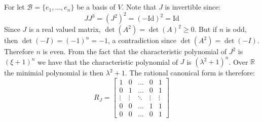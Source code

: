 \documentclass[crop=false,class=article]{standalone}                           %
\begin{document}
    \section{}
    \section{}
        For let $\mathscr{B}=\{e_{1},\dots,e_{n}\}$ be a basis of $V$. Note that
        $J$ is invertible since:
        \begin{equation}
            JJ^{3}=(J^{2})^{2}=(\minus\textrm{Id})^{2}=\textrm{Id}
        \end{equation}
        Since $J$ is a real valued matrix, $\det(A^{2})=\det(A)^{2}\geq{0}$.
        But if $n$ is odd, then $\det(\minus{I})=(\minus{1})^{n}=\minus{1}$,
        a contradiction since $\det(A^{2})=\det(\minus{I})$. Therefore $n$ is
        even. From the fact that the characteristic polynomial of $J^{2}$ is
        $(\xi+1)^{n}$ we have that the characteristic polynomial of $J$ is
        $(\lambda^{2}+1)^{n}$. Over $\mathbb{R}$ the minimial polynomial is then
        $\lambda^{2}+1$. The rational canonical form is therefore:
        \begin{equation}
            R_{J}=
            \begin{bmatrix}
                1&0&\dots&0&1\\
                0&1&\dots&0&1\\
                \vdots&\vdots&\ddots&\vdots&\vdots\\
                0&0&\dots&1&1\\
                0&0&\dots&0&1
            \end{bmatrix}
        \end{equation}
    \section{}
\end{document}
